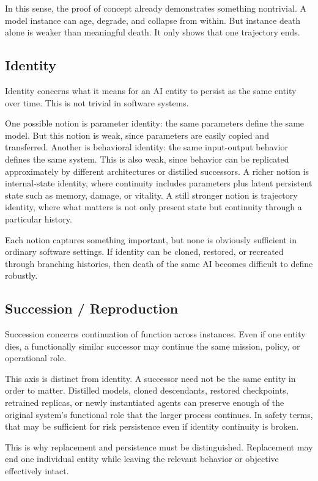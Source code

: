 \documentclass[11pt]{article}
\begin{document}
In this sense, the proof of concept already demonstrates something nontrivial. A model instance can age, degrade, and collapse from within. But instance death alone is weaker than meaningful death. It only shows that one trajectory ends.

\subsection{Identity}

Identity concerns what it means for an AI entity to persist as the same entity over time. This is not trivial in software systems.

One possible notion is parameter identity: the same parameters define the same model. But this notion is weak, since parameters are easily copied and transferred. Another is behavioral identity: the same input-output behavior defines the same system. This is also weak, since behavior can be replicated approximately by different architectures or distilled successors. A richer notion is internal-state identity, where continuity includes parameters plus latent persistent state such as memory, damage, or vitality. A still stronger notion is trajectory identity, where what matters is not only present state but continuity through a particular history.

Each notion captures something important, but none is obviously sufficient in ordinary software settings. If identity can be cloned, restored, or recreated through branching histories, then death of the same AI becomes difficult to define robustly.

\subsection{Succession / Reproduction}

Succession concerns continuation of function across instances. Even if one entity dies, a functionally similar successor may continue the same mission, policy, or operational role.

This axis is distinct from identity. A successor need not be the same entity in order to matter. Distilled models, cloned descendants, restored checkpoints, retrained replicas, or newly instantiated agents can preserve enough of the original system's functional role that the larger process continues. In safety terms, that may be sufficient for risk persistence even if identity continuity is broken.

This is why replacement and persistence must be distinguished. Replacement may end one individual entity while leaving the relevant behavior or objective effectively intact.
\end{document}
